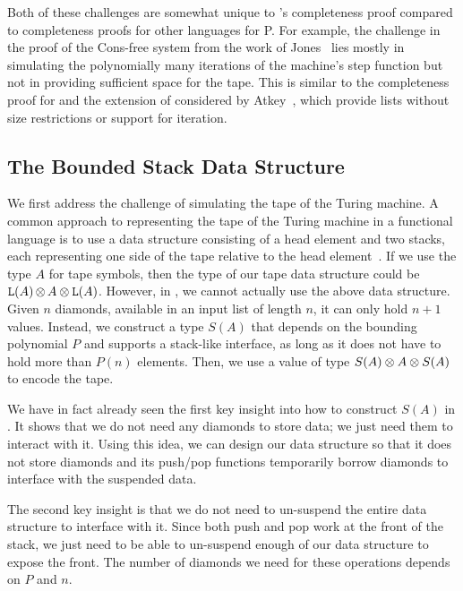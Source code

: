 Both of these challenges are somewhat unique to \lfpl's completeness
proof compared to completeness proofs for other languages for P.
%
For example, the challenge in the proof of the Cons-free system from
the work of Jones~\cite{Jones2001} lies mostly in simulating the
polynomially many iterations of the machine’s step function but not in
providing sufficient space for the tape.
%
This is similar to the completeness proof for \lfplplus and the
extension of \lfpl considered by
Atkey~\cite{atkeyPolynomialTimeDependent2024}, which provide
lists without size restrictions or support for iteration.


\subsection{The Bounded Stack Data Structure}
\label{sec:completeness-bounded-stack-definition}

We first address the challenge of simulating the tape of the Turing machine. A common approach to representing the tape of the Turing machine in a functional language is to use a data structure consisting of a head element and two stacks, each representing one side of the tape relative to the head element~\cite{Okasaki99}. If we use the type $A$ for tape symbols, then the type of our tape data structure could be $\tptens{\tplist{A}}{\tptens{A}{\tplist{A}}}$. However, in \lfpl, we cannot actually use the above data structure.
%
Given $n$ diamonds, available in an input list of length $n$, it can only hold $n + 1$ values. Instead, we construct a type $S(A)$ that depends on the bounding polynomial $P$ and supports a stack-like interface, as long as it does not have to hold more than $P(n)$ elements. Then, we use a value of type $\tptens{S(A)}{\tptens{A}{S(A)}}$ to encode the tape.

We have in fact already seen the first key insight into how to construct $S(A)$ in . It shows that we do not need any diamonds to store data; we just need them to interact with it. Using this idea, we can design our data structure so that it does not store diamonds and its push/pop functions temporarily borrow diamonds to interface with the suspended data.

The second key insight is that we do not need to un-suspend the entire data structure to interface with it.
%
Since both push and pop work at the front of the stack, we just need to be able to un-suspend enough of our data structure to expose the front.
%
The number of diamonds we need for these operations depends on $P$ and $n$.

